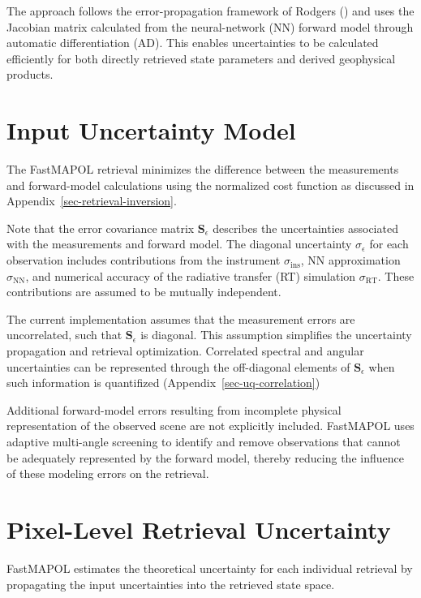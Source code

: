 \documentclass[
  11pt,
  letterpaper,
]{scrreprt}
\begin{document}
The approach follows the error-propagation framework of Rodgers
() and uses the Jacobian matrix
calculated from the neural-network (NN) forward model through automatic
differentiation (AD). This enables uncertainties to be calculated
efficiently for both directly retrieved state parameters and derived
geophysical products.

\section{Input Uncertainty Model}\label{input-uncertainty-model-1}

The FastMAPOL retrieval minimizes the difference between the
measurements and forward-model calculations using the normalized cost
function as discussed in Appendix~\ref{sec-retrieval-inversion}.

Note that the error covariance matrix \(\mathbf{S}_{\epsilon}\)
describes the uncertainties associated with the measurements and forward
model. The diagonal uncertainty \(\sigma_{\epsilon}\) for each
observation includes contributions from the instrument
\(\sigma_{\mathrm{ins}}\), NN approximation \(\sigma_{\mathrm{NN}}\),
and numerical accuracy of the radiative transfer (RT) simulation
\(\sigma_{\mathrm{RT}}\). These contributions are assumed to be mutually
independent.

The current implementation assumes that the measurement errors are
uncorrelated, such that \(\mathbf{S}_{\epsilon}\) is diagonal. This
assumption simplifies the uncertainty propagation and retrieval
optimization. Correlated spectral and angular uncertainties can be
represented through the off-diagonal elements of
\(\mathbf{S}_{\epsilon}\) when such information is quantifized
(Appendix~\ref{sec-uq-correlation})

Additional forward-model errors resulting from incomplete physical
representation of the observed scene are not explicitly included.
FastMAPOL uses adaptive multi-angle screening to identify and remove
observations that cannot be adequately represented by the forward model,
thereby reducing the influence of these modeling errors on the
retrieval.

\section{Pixel-Level Retrieval
Uncertainty}\label{pixel-level-retrieval-uncertainty}

FastMAPOL estimates the theoretical uncertainty for each individual
retrieval by propagating the input uncertainties into the retrieved
state space.
\end{document}
